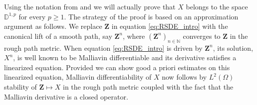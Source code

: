\documentclass[11pt,a4paper]{article}
\theoremstyle{plain}
\begin{document}

Using the notation from \cite{malliavin2015stochastic} and \cite{nualart2006malliavin} we will actually prove that $X$ belongs to the space $\mathbb{D}^{1,p}$ for every $p\geq 1$.
The strategy of the proof is based on an approximation argument as follows. We replace $\mathbf{Z}$ in equation \eqref{eq:RSDE_intro} with the canonical lift of a smooth path, say $\mathbf{Z}^n$, where $(\mathbf{Z}^n)_{n\in \mathbb{N}}$ converges to $\mathbf{Z}$ in the rough path metric.
When equation \eqref{eq:RSDE_intro} is driven by $\mathbf{Z}^n$, its solution, $X^n$, is well known to be Malliavin differentiable and its derivative satisfies a linearized equation. 
Provided we can show good a priori estimates on this linearized equation, 
Malliavin differentiability of $X$ now follows by $L^2(\Omega)$ stability of $\mathbf{Z} \mapsto X$ in the rough path metric coupled with the fact that the Malliavin derivative is a closed operator.
\end{document}
